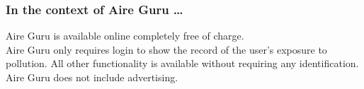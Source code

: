 \subsubsection*{In the context of Aire Guru \ldots} 

Aire Guru is available online completely free of charge. \\

Aire Guru only requires login to show the record of the user's exposure to pollution. All other functionality is available without requiring any identification. \\

Aire Guru does not include advertising.